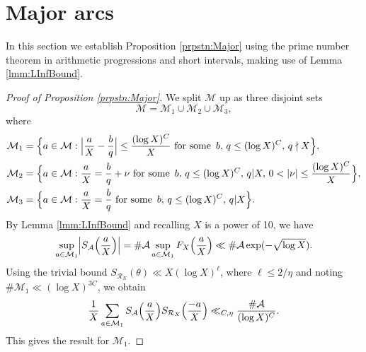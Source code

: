 \documentclass[10pt]{amsart}
\theoremstyle{plain}
\numberwithin{sblmm}{thrm}
\numberwithin{equation}{section}
\begin{document}
\section{Major arcs}\label{sec:Major}
%
%
%
%
In this section we establish Proposition \ref{prpstn:Major} using the prime number theorem in arithmetic progressions and short intervals, making use of Lemma \ref{lmm:LInfBound}.
%
%
%
%
\begin{proof}[Proof of Proposition \ref{prpstn:Major}]
%
We split $\mathcal{M}$ up as three disjoint sets
\[
\mathcal{M}=\mathcal{M}_1\cup\mathcal{M}_2\cup\mathcal{M}_3,
\]
where
%
\begin{align*}
\mathcal{M}_1&=\Bigl\{a\in\mathcal{M}:\Bigl|\frac{a}{X}-\frac{b}{q}\Bigr|\le\frac{(\log{X})^C}{X}\text{ for some }\,b,\,q\le (\log{X})^C,\,q\nmid X\Bigr\},\\
\mathcal{M}_2&=\Bigl\{a\in\mathcal{M}:\frac{a}{X}
=\frac{b}{q}+\nu\text{ for some }\,b,\,q\le (\log{X})^C,\,q|X,\,0<|\nu|\le \frac{(\log{X})^C}{X}\Bigr\},\\
\mathcal{M}_3&=\Bigl\{a\in\mathcal{M}:\frac{a}{X}
=\frac{b}{q}\text{ for some }\,b,\,q\le (\log{X})^C,\,q|X\Bigr\}.\\
\end{align*}
%
By Lemma \ref{lmm:LInfBound} and recalling $X$ is a power of 10, we have
\[
\sup_{a\in\mathcal{M}_1}\Bigl|S_{\mathcal{A}}\Bigl(\frac{a}{X}\Bigr)\Bigr|=\#\mathcal{A}\sup_{a\in\mathcal{M}_1}F_X\Bigl(\frac{a}{X}\Bigr)\ll \#\mathcal{A}\exp(-\sqrt{\log{X}}).
\]
Using the trivial bound $S_{\mathcal{R}_X}(\theta)\ll X(\log{X})^{\ell}$, where $\ell\le 2/\eta$ and noting $\#\mathcal{M}_1\ll (\log{X})^{3C}$, we obtain
%
\begin{equation}
\frac{1}{X}\sum_{a\in\mathcal{M}_1}S_{\mathcal{A}}\Bigl(\frac{a}{X}\Bigr)S_{\mathcal{R}_X}\Bigl(\frac{-a}{X}\Bigr)\ll_{C,\eta} \frac{\#\mathcal{A}}{(\log{X})^C}.
\label{eq:M1}
\end{equation}
%
This gives the result for $\mathcal{M}_1$.


\end{proof}
\end{document}
